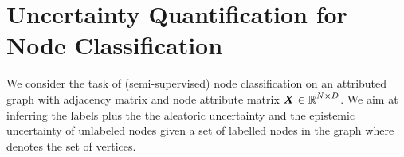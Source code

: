 \section{Uncertainty Quantification for Node Classification}

We consider the task of (semi-supervised) node classification on an attributed graph \smash{$\graph = \left(\adj, \features\right)$}  with adjacency matrix  and node attribute matrix $\bm{X} \in \operatorname{\mathbb{R}}^{N \times D}$. We aim at inferring the labels  plus the the aleatoric uncertainty  and the epistemic uncertainty  of unlabeled nodes \smash{$\nodev \in \nodeslabeled$} given a set of labelled nodes \smash{$\nodeu \in \nodesunlabeled$} in the graph where \smash{$\vertices  = \nodeslabeled \cup \nodesunlabeled$} denotes the set of vertices.





